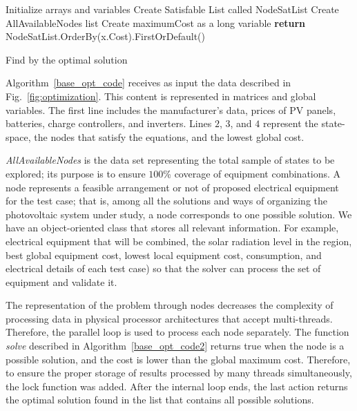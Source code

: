 \documentclass[journal]{IEEEtran}
\begin{document}
\begin{algorithm}[ht]
\SetAlgoLined
{}
Initialize arrays and variables\;
Create Satisfable List called NodeSatList\;
Create AllAvailableNodes list\;
Create maximumCost as a long variable\;
\textbf{return} NodeSatList.OrderBy(x.Cost).FirstOrDefault()
\caption{Find by the optimal solution}
\label{base_opt_code}
\end{algorithm}

Algorithm~\ref{base_opt_code} receives as input the data described in Fig.~\ref{fig:optimization}. This content is represented in matrices and global variables. The first line includes the manufacturer's data, prices of PV panels, batteries, charge controllers, and inverters. Lines $2$, $3$, and $4$ represent the state-space, the nodes that satisfy the equations, and the lowest global cost.

\textit{AllAvailableNodes} is the data set representing the total sample of states to be explored; its purpose is to ensure $100$\% coverage of equipment combinations. A node represents a feasible arrangement or not of proposed electrical equipment for the test case; that is, among all the solutions and ways of organizing the photovoltaic system under study, a node corresponds to one possible solution. We have an object-oriented class that stores all relevant information. For example, electrical equipment that will be combined, the solar radiation level in the region, best global equipment cost, lowest local equipment cost, consumption, and electrical details of each test case) so that the solver can process the set of equipment and validate it.

The representation of the problem through nodes decreases the complexity of processing data in physical processor architectures that accept multi-threads. Therefore, the parallel loop is used to process each node separately. The function \textit{solve} described in Algorithm~\ref{base_opt_code2} returns true when the node is a possible solution, and the cost is lower than the global maximum cost. Therefore, to ensure the proper storage of results processed by many threads simultaneously, the lock function was added. After the internal loop ends, the last action returns the optimal solution found in the list that contains all possible solutions.
\end{document}
